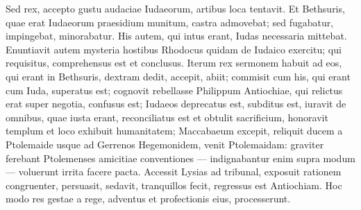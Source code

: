 \begin{biblechapter}
\begin{biblechapter}
\begin{biblechapter}
\begin{biblechapter}
\begin{biblechapter}
\begin{biblechapter}
\begin{biblechapter}
\begin{biblechapter}
\begin{biblechapter}
\begin{biblechapter}
\begin{biblechapter}
\begin{biblechapter}
\begin{biblechapter}
 \verse Sed rex, accepto gustu audaciae Iudaeorum, artibus loca tentavit. 
\verse Et Bethsuris, quae erat Iudaeorum praesidium munitum, castra admovebat; sed fugabatur, impingebat, minorabatur. 
\verse His autem, qui intus erant, Iudas necessaria mittebat. 
\verse Enuntiavit autem mysteria hostibus Rhodocus quidam de Iudaico exercitu; qui requisitus, comprehensus est et conclusus.
 \verse Iterum rex sermonem habuit ad eos, qui erant in Bethsuris, dextram dedit, accepit, abiit; 
\verse commisit cum his, qui erant cum Iuda, superatus est; cognovit rebellasse Philippum Antiochiae, qui relictus erat super negotia, confusus est; Iudaeos deprecatus est, subditus est, iuravit de omnibus, quae iusta erant, reconciliatus est et obtulit sacrificium, honoravit templum et loco exhibuit humanitatem; 
\verse Maccabaeum excepit, reliquit ducem a Ptolemaide usque ad Gerrenos Hegemonidem, 
\verse venit Ptolemaidam: graviter ferebant Ptolemenses amicitiae conventiones — indignabantur enim supra modum — voluerunt irrita facere pacta. 
\verse Accessit Lysias ad tribunal, exposuit rationem congruenter, persuasit, sedavit, tranquillos fecit, regressus est Antiochiam. Hoc modo res gestae a rege, adventus et profectionis eius, processerunt.
 

\end{biblechapter}
\end{biblechapter}
\end{biblechapter}
\end{biblechapter}
\end{biblechapter}
\end{biblechapter}
\end{biblechapter}
\end{biblechapter}
\end{biblechapter}
\end{biblechapter}
\end{biblechapter}
\end{biblechapter}
\end{biblechapter}
